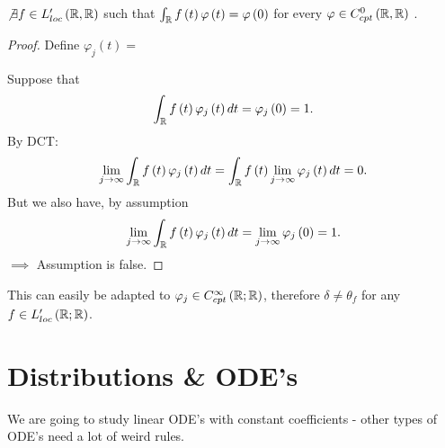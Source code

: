 \begin{example}	
	\begin{fact}
		$\not\exists f \in  L_{loc}'\left( \mathbb{R}, \mathbb{R} \right) $ such that $\int_{\mathbb{R}}^{ } f\left(  t\right)  \varphi\left( t \right)  = \varphi\left( 0 \right) $ for every $\varphi \in  C^{0}_{cpt}\left( \mathbb{R}, \mathbb{R} \right)$ .  
\begin{proof}
	Define $\varphi_{j}\left( t \right)  = $

	Suppose that 
	\[
		\int_{\mathbb{R}}^{} f\left( t  \right) \varphi_{j}\left( t \right) dt = \varphi_{j}\left( 0 \right) = 1  
	.\] 
	By DCT: 
	\[
		\lim_{j \to \infty} \int_{\R}^{ } f\left( t \right) \varphi_{j}\left( t \right) dt = \int_{\R}^{ } f\left( t  \right) \lim_{j \to \infty} \varphi_{j}\left( t  \right) dt = 0 
	.\] 
	But we also have, by assumption
	\begin{align*}
		\lim_{j \to \infty} \int_{\R}^{ } f\left( t \right) \varphi_{j}\left( t \right) dt = \lim_{j \to \infty} \varphi_{j}\left( 0 \right) = 1 
	.\end{align*}
	$\implies $ Assumption is false.
\end{proof}	

	\end{fact}
\end{example}
This can easily be adapted to $\varphi_{j} \in C^{\infty}_{cpt}\left( \mathbb{R}; \mathbb{R} \right) $, therefore $\delta \neq \theta _{f}$ for any $f \in  L'_{loc}\left( \mathbb{R}; \mathbb{R} \right) $.  

\section{Distributions \& ODE's}
We are going to study linear ODE's with constant coefficients - other types of ODE's need a lot of weird rules. 

